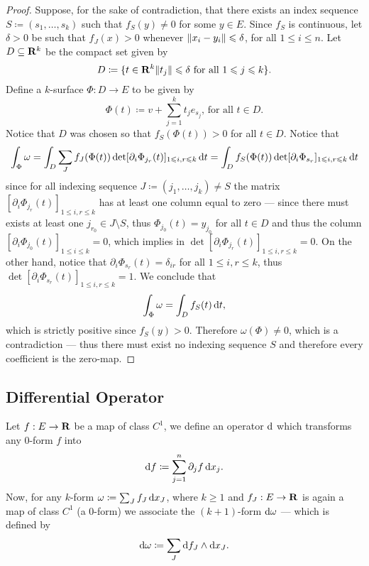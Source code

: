 \begin{proof}
Suppose, for the sake of contradiction, that there exists an index sequence \(S
\coloneq (s_1, \dots, s_{k})\) such that \(f_{S}(y) \neq 0\) for some \(y \in
E\). Since \(f_{S}\) is continuous, let \(\delta > 0\) be such that \(f_J(x) >
0\) whenever \(\lVert x_i - y_i\rVert \leqslant \delta\), for all \(1 \leq i \leq n\). Let
\(D \subseteq \mathbf{R}^k\) be the compact set given by
\[
  D \coloneq \{t \in \mathbf{R}^{k} \relax \lVert t_j\rVert \leqslant \delta
  \text{ for all } 1 \leqslant j \leqslant k\}.
\]
Define a \(k\)-surface \(\Phi: D \to E\) to be given by
\[
  \Phi(t) \coloneq v + \sum_{j=1}^k t_j e_{s_j}\text{, for all } t \in D.
\]
Notice that \(D\) was chosen so that \(f_S(\Phi(t)) > 0\) for all \(t \in
D\). Notice that
\[
  \int_{\Phi} \omega = \int_D \sum_J f_J(\Phi(t))
  \det[\partial_i \Phi_{j_r}(t)]_{1 \leqslant i, r \leqslant k}\, \mathrm{d} t
  = \int_D f_S(\Phi(t)) \det[\partial_i \Phi_{s_r}]_{1 \leqslant i, r \leqslant k}\, \mathrm{d} t
\]
since for all indexing sequence \(J \coloneq (j_1, \dots, j_k) \neq S\)
the matrix \([\partial_i \Phi_{j_r}(t)]_{1 \leq i, r \leq k}\) has at least one
column equal to zero --- since there must exists at least one \(j_{r_0} \in J
\setminus S\), thus \(\Phi_{j_0}(t) = y_{j_0}\) for all \(t \in D\) and thus the
column \([\partial_i \Phi_{j_0}(t)]_{1 \leq i \leq k} = 0\), which implies in
\(\det [\partial_i \Phi_{j_r}(t)]_{1 \leq i, r \leq k} = 0\). On the other hand,
notice that \(\partial_i \Phi_{s_r}(t) = \delta_{i r}\) for all \(1 \leq i, r
\leq k\), thus \(\det [\partial_i \Phi_{s_r}(t)]_{1 \leq i, r \leq k} = 1\). We
conclude that
\[
  \int_{\Phi} \omega = \int_D f_S(t)\, \mathrm{d} t,
\]
which is strictly positive since \(f_S(y) > 0\). Therefore \(\omega(\Phi) \neq
0\), which is a contradiction --- thus there must exist no indexing sequence
\(S\) and therefore every coefficient is the zero-map.
\end{proof}

\subsection{Differential Operator}

\begin{definition}
\label{def:differential-operator-form}
Let \(f: E \to \mathbf{R}\) be a map of class \(C^1\), we define an operator \(\mathrm{d}\)
which transforms any \(0\)-form \(f\) into
\[
  \mathrm{d} f \coloneq \sum_{j=1}^n \partial_j f\, \mathrm{d} x_j.
\]
Now, for any \(k\)-form \(\omega \coloneq \sum_J f_J\, \mathrm{d} x_J\), where \(k
\geq 1\) and \(f_J: E \to \mathbf{R}\) is again a map of class \(C^1\) (a \(0\)-form) we
associate the \((k+1)\)-form \(\mathrm{d} \omega\) --- which is defined by
\[
  \mathrm{d} \omega \coloneq \sum_J \mathrm{d} f_J \wedge \mathrm{d} x_{J}.
\]
\end{definition}

